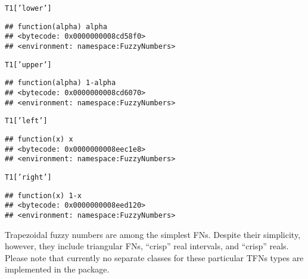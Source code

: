 \documentclass[11pt]{article}\usepackage[]{graphicx}\usepackage[]{color}
\makeatletter
\newcommand{\hlstr}[1]{\textcolor[rgb]{0.192,0.494,0.8}{#1}}%
\newcommand{\hlstd}[1]{\textcolor[rgb]{0.345,0.345,0.345}{#1}}%
\newenvironment{kframe}{%
 \def\at@end@of@kframe{}%
 \ifinner\ifhmode%
  \def\at@end@of@kframe{\end{minipage}}%
  \begin{minipage}{\columnwidth}%
 \fi\fi%
 \def\FrameCommand##1{\hskip\@totalleftmargin \hskip-\fboxsep
 \colorbox{shadecolor}{##1}\hskip-\fboxsep
     \hskip-\linewidth \hskip-\@totalleftmargin \hskip\columnwidth}%
 \MakeFramed {\advance\hsize-\width
   \@totalleftmargin\z@ \linewidth\hsize
   \@setminipage}}%
 {\par\unskip\endMakeFramed%
 \at@end@of@kframe}
\newenvironment{knitrout}{}{} %
\makeatother
\begin{document}
\begin{knitrout}\small
{}\color{fgcolor}\begin{kframe}
\begin{alltt}
\hlstd{T1[}\hlstr{'lower'}\hlstd{]}
\end{alltt}
\begin{verbatim}
## function(alpha) alpha
## <bytecode: 0x0000000008cd58f0>
## <environment: namespace:FuzzyNumbers>
\end{verbatim}
\begin{alltt}
\hlstd{T1[}\hlstr{'upper'}\hlstd{]}
\end{alltt}
\begin{verbatim}
## function(alpha) 1-alpha
## <bytecode: 0x0000000008cd6070>
## <environment: namespace:FuzzyNumbers>
\end{verbatim}
\begin{alltt}
\hlstd{T1[}\hlstr{'left'}\hlstd{]}
\end{alltt}
\begin{verbatim}
## function(x) x
## <bytecode: 0x0000000008eec1e8>
## <environment: namespace:FuzzyNumbers>
\end{verbatim}
\begin{alltt}
\hlstd{T1[}\hlstr{'right'}\hlstd{]}
\end{alltt}
\begin{verbatim}
## function(x) 1-x
## <bytecode: 0x0000000008eed120>
## <environment: namespace:FuzzyNumbers>
\end{verbatim}
\end{kframe}
\end{knitrout}



\bigskip
Trapezoidal fuzzy numbers are among the simplest FNs.
Despite their simplicity, however, they include triangular FNs,
``crisp'' real intervals, and ``crisp'' reals.
Please note that currently no separate classes for these particular TFNs types
are implemented in the package.
\end{document}
